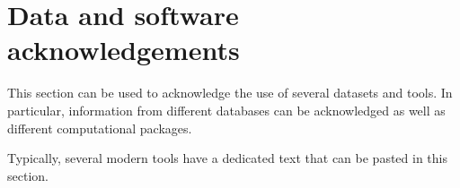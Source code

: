 \pagestyle{NoNumberChapStyle}
\chapter*{Data and software acknowledgements}\label{data_software_ack}

\begingroup
{}

This section can be used to acknowledge the use of several datasets and tools. In particular, information from different databases can be acknowledged as well as different computational packages.

Typically, several modern tools have a dedicated text that can be pasted in this section.

\endgroup
